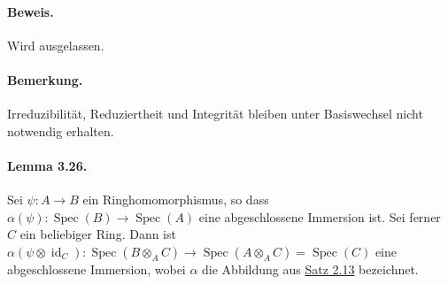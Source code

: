 \paragraph{Beweis.} Wird ausgelassen.

\paragraph{Bemerkung.} Irreduzibilität, Reduziertheit und Integrität bleiben unter Basiswechsel nicht notwendig erhalten.

\paragraph{Lemma 3.26.}\label{3.26} Sei $\psi:A\to B$ ein Ringhomomorphismus, so dass $\alpha(\psi):\operatorname{Spec}(B)\to\operatorname{Spec}(A)$ eine abgeschlossene Immersion ist. Sei ferner $C$ ein beliebiger Ring. Dann ist $\alpha(\psi\otimes\operatorname{id}_C):\operatorname{Spec}(B\otimes_AC)\to\operatorname{Spec}(A\otimes_AC)=\operatorname{Spec}(C)$ eine abgeschlossene Immersion, wobei $\alpha$ die Abbildung aus \hyperref[2.13]{Satz 2.13} bezeichnet.

